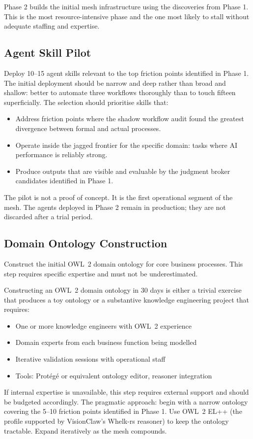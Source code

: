 Phase 2 builds the initial mesh infrastructure using the discoveries from Phase 1. This is the most resource-intensive phase and the one most likely to stall without adequate staffing and expertise.

\subsection{Agent Skill Pilot}

Deploy 10--15 agent skills relevant to the top friction points identified in Phase 1. The initial deployment should be narrow and deep rather than broad and shallow: better to automate three workflows thoroughly than to touch fifteen superficially. The selection should prioritise skills that:

\begin{itemize}
  \item Address friction points where the shadow workflow audit found the greatest divergence between formal and actual processes.
  \item Operate inside the jagged frontier for the specific domain: tasks where AI performance is reliably strong.
  \item Produce outputs that are visible and evaluable by the judgment broker candidates identified in Phase 1.
\end{itemize}

The pilot is not a proof of concept. It is the first operational segment of the mesh. The agents deployed in Phase 2 remain in production; they are not discarded after a trial period.

\subsection{Domain Ontology Construction}

Construct the initial OWL~2 domain ontology for core business processes. This step requires specific expertise and must not be underestimated.

\begin{cautionbox}[title={Ontology Construction Is Not a Side Project}]
Constructing an OWL~2 domain ontology in 30 days is either a trivial exercise that produces a toy ontology or a substantive knowledge engineering project that requires:
\begin{itemize}
  \item One or more knowledge engineers with OWL~2 experience
  \item Domain experts from each business function being modelled
  \item Iterative validation sessions with operational staff
  \item Tools: Prot\'{e}g\'{e} or equivalent ontology editor, reasoner integration
\end{itemize}
If internal expertise is unavailable, this step requires external support and should be budgeted accordingly. The pragmatic approach: begin with a narrow ontology covering the 5--10 friction points identified in Phase 1. Use OWL~2 EL++ (the profile supported by VisionClaw's Whelk-rs reasoner) to keep the ontology tractable. Expand iteratively as the mesh compounds.
\end{cautionbox}

